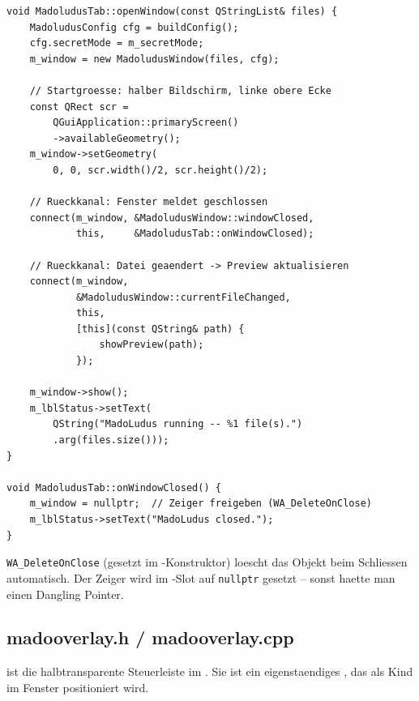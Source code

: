 \begin{lstlisting}[caption={openWindow: Fenster starten und verbinden}]
void MadoludusTab::openWindow(const QStringList& files) {
    MadoludusConfig cfg = buildConfig();
    cfg.secretMode = m_secretMode;
    m_window = new MadoludusWindow(files, cfg);

    // Startgroesse: halber Bildschirm, linke obere Ecke
    const QRect scr =
        QGuiApplication::primaryScreen()
        ->availableGeometry();
    m_window->setGeometry(
        0, 0, scr.width()/2, scr.height()/2);

    // Rueckkanal: Fenster meldet geschlossen
    connect(m_window, &MadoludusWindow::windowClosed,
            this,     &MadoludusTab::onWindowClosed);

    // Rueckkanal: Datei geaendert -> Preview aktualisieren
    connect(m_window,
            &MadoludusWindow::currentFileChanged,
            this,
            [this](const QString& path) {
                showPreview(path);
            });

    m_window->show();
    m_lblStatus->setText(
        QString("MadoLudus running -- %1 file(s).")
        .arg(files.size()));
}

void MadoludusTab::onWindowClosed() {
    m_window = nullptr;  // Zeiger freigeben (WA_DeleteOnClose)
    m_lblStatus->setText("MadoLudus closed.");
}
\end{lstlisting}

\verb|WA_DeleteOnClose| (gesetzt im -Konstruktor)
loescht das Objekt beim Schliessen automatisch.
Der Zeiger  wird im -Slot
auf \verb|nullptr| gesetzt -- sonst haette man einen
Dangling Pointer.

\subsection{madooverlay.h / madooverlay.cpp}

 ist die halbtransparente Steuerleiste
im . Sie ist ein eigenstaendiges
, das als Kind im Fenster positioniert wird.

